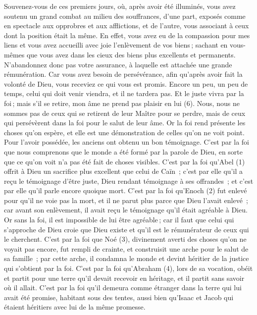 \begin{multicols}{2}
Souvenez-vous de ces premiers jours, où, après avoir été illuminés, vous avez soutenu un grand combat au milieu des souffrances,
d'une part, exposés comme en spectacle aux opprobres et aux afflictions, et de l'autre, vous associant à ceux dont la position était la même.
En effet, vous avez eu de la compassion pour mes liens et vous avez accueilli avec joie l'enlèvement de vos biens ; sachant en vous-mêmes que vous avez dans les cieux des biens plus excellents et permanents.
N’abandonnez donc pas votre assurance, à laquelle est attachée une grande rémunération.
Car vous avez besoin de persévérance, afin qu'après avoir fait la volonté de Dieu, vous receviez ce qui vous est promis.
Encore un peu, un peu de temps, celui qui doit venir viendra, et il ne tardera pas.
Et le juste vivra par la foi ; mais s’il se retire, mon âme ne prend pas plaisir en lui (6).
Nous, nous ne sommes pas de ceux qui se retirent de leur Maître pour se perdre, mais de ceux qui persévèrent dans la foi pour le salut de leur âme.
\VerseOne{}Or la foi rend présente les choses qu'on espère, et elle est une démonstration de celles qu'on ne voit point.
Pour l’avoir possédée, les anciens ont obtenu un bon témoignage.
C’est par la foi que nous comprenons que le monde a été formé par la parole de Dieu, en sorte que ce qu’on voit n’a pas été fait de choses visibles.
C’est par la foi qu’Abel (1) offrit à Dieu un sacrifice plus excellent que celui de Caïn ; c’est par elle qu’il a reçu le témoignage d’être juste, Dieu rendant témoignage à ses offrandes ; et c’est par elle qu’il parle encore quoique mort.
C’est par la foi qu’Enoch (2) fut enlevé pour qu’il ne voie pas la mort, et il ne parut plus parce que Dieu l’avait enlevé ; car avant son enlèvement, il avait reçu le témoignage qu’il était agréable à Dieu.
Or sans la foi, il est impossible de lui être agréable ; car il faut que celui qui s’approche de Dieu croie que Dieu existe et qu'il est le rémunérateur de ceux qui le cherchent.
C’est par la foi que Noé (3), divinement averti des choses qu’on ne voyait pas encore, fut rempli de crainte, et construisit une arche pour le salut de sa famille ; par cette arche, il condamna le monde et devint héritier de la justice qui s’obtient par la foi.
C’est par la foi qu’Abraham (4), lors de sa vocation, obéit et partit pour une terre qu'il devait recevoir en héritage, et il partit sans savoir où il allait.
C’est par la foi qu’il demeura comme étranger dans la terre qui lui avait été promise, habitant sous des tentes, aussi bien qu’Isaac et Jacob qui étaient héritiers avec lui de la même promesse.

\end{multicols}
